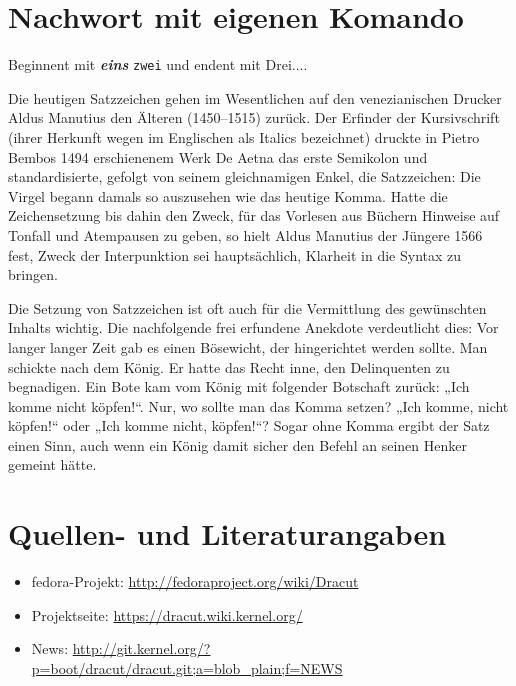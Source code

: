 \documentclass[10pt,a4paper]{article}
\newcommand{\doppelt}[2]{\textit{\textbf{#1}} \texttt{#2}}
\begin{document}
\section{Nachwort mit eigenen Komando}

Beginnent mit \doppelt{eins}{zwei} und endent mit Drei....

Die heutigen Satzzeichen gehen im Wesentlichen auf den venezianischen Drucker
Aldus Manutius den Älteren (1450–1515) zurück. Der Erfinder der Kursivschrift
(ihrer Herkunft wegen im Englischen als Italics bezeichnet) druckte in Pietro
Bembos 1494 erschienenem Werk De Aetna das erste Semikolon und standardisierte,
gefolgt von seinem gleichnamigen Enkel, die Satzzeichen: Die Virgel begann
damals so auszusehen wie das heutige Komma. Hatte die Zeichensetzung bis dahin
den Zweck, für das Vorlesen aus Büchern Hinweise auf Tonfall und Atempausen zu
geben, so hielt Aldus Manutius der Jüngere 1566 fest, Zweck der Interpunktion
sei hauptsächlich, Klarheit in die Syntax zu bringen.


Die Setzung von Satzzeichen ist oft auch für die Vermittlung des gewünschten
Inhalts wichtig. Die nachfolgende frei erfundene Anekdote verdeutlicht dies:
Vor langer langer Zeit gab es einen Bösewicht, der hingerichtet werden sollte.
Man schickte nach dem König. Er hatte das Recht inne, den Delinquenten zu
begnadigen. Ein Bote kam vom König mit folgender Botschaft zurück: „Ich
komme nicht köpfen!“. Nur, wo sollte man das Komma setzen? „Ich komme, nicht
köpfen!“ oder „Ich komme nicht, köpfen!“? Sogar ohne Komma ergibt der Satz
einen Sinn, auch wenn ein König damit sicher den Befehl an seinen Henker
gemeint hätte.


\section{Quellen- und Literaturangaben}
\label{sec:quell}

\begin{itemize}
 \item fedora-Projekt: \url{http://fedoraproject.org/wiki/Dracut}
 \item Projektseite: \url{https://dracut.wiki.kernel.org/}
 \item News: \url{http://git.kernel.org/?p=boot/dracut/dracut.git;a=blob_plain;f=NEWS}
\end{itemize}


\end{document}
